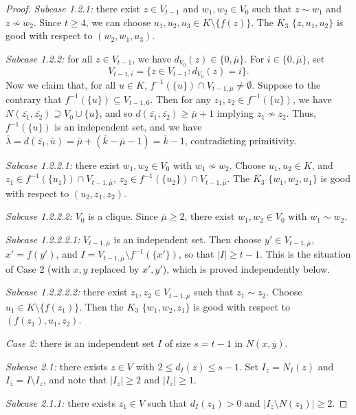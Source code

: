 \documentclass{article}
\newcommand\sm{\setminus}
\theoremstyle{definition}
\begin{document}
\begin{proof}
    \textit{Subcase 1.2.1:} there exist $z\in V_{t-1}$ and $w_1,w_2\in V_0$ such that $z\sim w_1$ and $z\not\sim w_2$. Since $t\ge 4$, we can choose $u_1,u_2,u_3\in K\sm\{f(z)\}$. The $K_3$ $\{z,u_1,u_2\}$ is good with respect to $(w_2,w_1,u_3)$.

    \textit{Subcase 1.2.2:} for all $z\in V_{t-1}$, we have $d_{V_0}(z)\in\{0,\overline\mu\}$. For $i\in\{0,\overline\mu\}$, set
    $$V_{t-1,i}=\{z\in V_{t-1}:d_{V_0}(z)=i\}.$$
    Now we claim that, for all $u\in K$, $f^{-1}(\{u\})\cap V_{t-1,\overline\mu}\ne\emptyset$. Suppose to the contrary that $f^{-1}(\{u\})\subseteq V_{t-1,0}$. Then for any $z_1,z_2\in f^{-1}(\{u\})$, we have $N(\overline{z_1},\overline{z_2})\supseteq V_0\cup\{u\}$, and so $d(\overline{z_1},\overline{z_2})\ge\overline{\mu}+1$ implying $z_1\not\sim z_2$. Thus, $f^{-1}(\{u\})$ is an independent set, and we have $\overline\lambda=d(\overline{z_1},\overline u)=\overline\mu+(\overline k-\overline\mu-1)=\overline k-1$, contradicting primitivity. 

    \textit{Subcase 1.2.2.1:} there exist $w_1,w_2\in V_0$ with $w_1\not\sim w_2$. Choose $u_1,u_2\in K$, and $z_1\in f^{-1}(\{u_1\})\cap V_{t-1,\overline\mu}$, $z_2\in f^{-1}(\{u_2\})\cap V_{t-1,\overline\mu}$. The $\overline{K_3}$ $\{w_1,w_2,u_1\}$ is good with respect to $(u_2,z_1,z_2)$.

    \textit{Subcase 1.2.2.2:} $V_0$ is a clique. Since $\overline\mu\ge 2$, there exist $w_1,w_2\in V_0$ with $w_1\sim w_2$.
    
    \textit{Subcase 1.2.2.2.1:} $V_{t-1,\overline{\mu}}$ is an independent set. Then choose $y'\in V_{t-1,\overline{\mu}}$, $x'=f(y')$, and $I=V_{t-1,\overline{\mu}}\sm f^{-1}(\{x'\})$, so that $|I|\ge t-1$. This is the situation of Case 2 (with $x,y$ replaced by $x',y'$), which is proved independently below.

    \textit{Subcase 1.2.2.2.2:} there exist $z_1,z_2\in V_{t-1,\overline\mu}$ such that $z_1\sim z_2$. Choose $u_1\in K\sm\{f(z_1)\}$. Then the $K_3$ $\{w_1,w_2,z_1\}$ is good with respect to $(f(z_1),u_1,z_2)$.
    
    
    \textit{Case 2:} there is an independent set $I$ of size $s=t-1$ in $N(x,\overline y)$.

    \textit{Subcase 2.1:} there exists $z\in V$ with $2\le d_I(z)\le s-1$. Set $I_z=N_I(z)$ and $I_{\overline{z}}=I\sm I_z$, and note that $|I_z|\ge 2$ and $|I_{\overline z}|\ge 1$.

    \textit{Subcase 2.1.1:} there exists $z_1\in V$ such that $d_I(z_1)>0$ and $|I_z\sm N(z_1)|\ge 2$. 
    

\end{proof}
\end{document}
